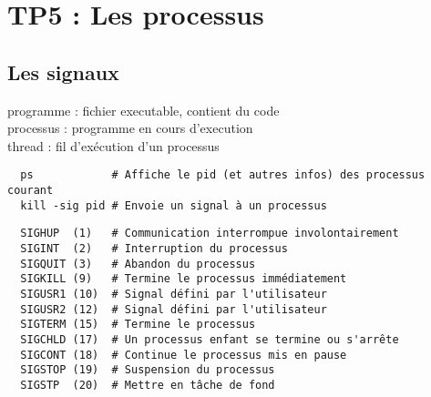 \documentclass{article}
\begin{document}
\section{TP5 : Les processus}

\subsection{Les signaux}

  programme : fichier executable, contient du code \\
  processus : programme en cours d'execution \\
  thread    : fil d'exécution d'un processus \\

\begin{verbatim}
  ps            # Affiche le pid (et autres infos) des processus courant
  kill -sig pid # Envoie un signal à un processus
\end{verbatim}

\begin{verbatim}
  SIGHUP  (1)   # Communication interrompue involontairement
  SIGINT  (2)   # Interruption du processus
  SIGQUIT (3)   # Abandon du processus
  SIGKILL (9)   # Termine le processus immédiatement
  SIGUSR1 (10)  # Signal défini par l'utilisateur
  SIGUSR2 (12)  # Signal défini par l'utilisateur
  SIGTERM (15)  # Termine le processus 
  SIGCHLD (17)  # Un processus enfant se termine ou s'arrête
  SIGCONT (18)  # Continue le processus mis en pause
  SIGSTOP (19)  # Suspension du processus
  SIGSTP  (20)  # Mettre en tâche de fond
\end{verbatim}
\end{document}
